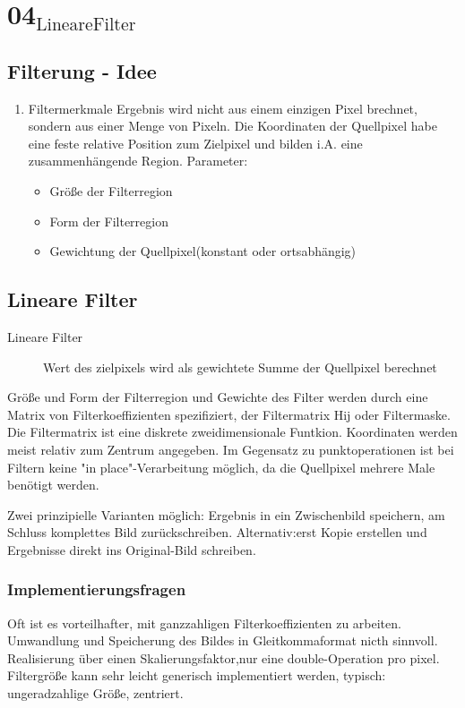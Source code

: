 \documentclass[11pt]{article}
\author{XUEXI}
\date{\today}
\title{}
\begin{document}
\tableofcontents

\section{04\(_{\text{LineareFilter}}\)}
\label{sec:org1108b83}
\subsection{Filterung - Idee}
\label{sec:org8a8b605}
\begin{enumerate}
\item Filtermerkmale
\label{sec:org87c955d}
Ergebnis wird nicht aus einem einzigen Pixel brechnet, sondern aus einer Menge von Pixeln. Die Koordinaten der Quellpixel habe eine feste relative Position zum Zielpixel und bilden i.A. eine zusammenhängende Region. Parameter:
\begin{itemize}
\item Größe der Filterregion
\item Form der Filterregion
\item Gewichtung der Quellpixel(konstant oder ortsabhängig)
\end{itemize}
\end{enumerate}
\subsection{Lineare Filter}
\label{sec:org452f42c}
\begin{description}
\item[{Lineare Filter}] Wert des zielpixels wird als gewichtete Summe der Quellpixel berechnet
\end{description}
Größe und Form der Filterregion und Gewichte des Filter werden durch eine Matrix von Filterkoeffizienten spezifiziert, der Filtermatrix Hij oder Filtermaske.
Die Filtermatrix ist eine diskrete zweidimensionale Funtkion.
Koordinaten werden meist relativ zum Zentrum angegeben.
Im Gegensatz zu punktoperationen ist bei Filtern keine "in place"-Verarbeitung möglich, da die Quellpixel mehrere Male benötigt werden.

Zwei prinzipielle Varianten möglich: Ergebnis in ein Zwischenbild speichern, am Schluss komplettes Bild zurückschreiben. Alternativ:erst Kopie erstellen und Ergebnisse direkt ins Original-Bild schreiben.

\subsubsection{Implementierungsfragen}
\label{sec:orgba36126}
Oft ist es vorteilhafter, mit ganzzahligen Filterkoeffizienten zu arbeiten. Umwandlung und Speicherung des Bildes in Gleitkommaformat nicth sinnvoll. Realisierung über einen Skalierungsfaktor,nur eine double-Operation pro pixel. Filtergröße kann sehr leicht generisch implementiert werden, typisch: ungeradzahlige Größe, zentriert.
\end{document}
